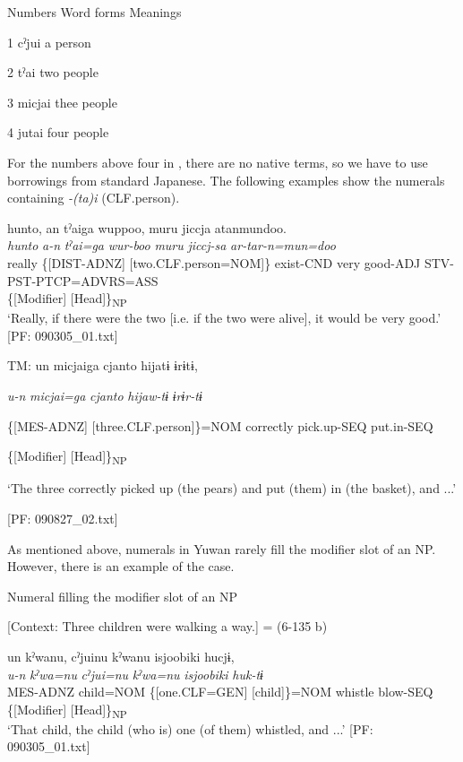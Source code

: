 Numbers  Word forms  Meanings

1  cˀjui  a person

2  tˀai  two people

3  micjai  thee people

4  jutai  four people

For the numbers above four in , there are no native terms, so we have to use borrowings from standard Japanese. The following examples show the numerals containing \textit{{}-(ta)i} (CLF.person).

\ea \label{ex:7:14}
\ea \label{ex:7:14a}
\gllll  hunto,  an  tˀaiga  wuppoo,  muru   jiccja  atanmundoo.\\
\textit{hunto}  \textit{a-n}  \textit{tˀai=ga}  \textit{wur-boo}  \textit{muru}  \textit{jiccj-sa}  \textit{ar-tar-n=mun=doo}\\
really  \{[DIST-ADNZ]  [two.CLF.person=NOM]\}  exist-CND  very   good-ADJ  STV-PST-PTCP=ADVRS=ASS\\
\{[Modifier]  [Head]\}\textsubscript{NP}    \\
\glt ‘Really, if there were the two [i.e. if the two were alive], it would be very good.’ [PF: 090305\_01.txt]

\ex \label{ex:7:14b}TM:  un  micjaiga  {\textbar}cjanto{\textbar}  hijatɨ  ɨrɨtɨ,

      \textit{u-n}  \textit{micjai=ga}  \textit{cjanto}  \textit{hijaw-tɨ}      \textit{ɨrɨr-tɨ}
                                                                             
      \{[MES-ADNZ]  [three.CLF.person]\}=NOM  correctly  pick.up-SEQ            put.in-SEQ

      \{[Modifier]  [Head]\}\textsubscript{NP}    

      ‘The three correctly picked up (the pears) and put (them) in (the basket), and ...’

      [PF: 090827\_02.txt]
    \z
\z

As mentioned above, numerals in Yuwan rarely fill the modifier slot of an NP. However, there is an example of the case.

\ea \label{ex:7:15}  Numeral filling the modifier slot of an NP

  [Context: Three children were walking a way.] = (6-135 b)

\gllll  un  kˀwanu,  cˀjuinu  kˀwanu  isjoobiki   hucjɨ,\\
\textit{u-n}  \textit{kˀwa=nu}  \textit{cˀjui=nu}  \textit{kˀwa=nu}  \textit{isjoobiki} \textit{huk-tɨ}\\
MES-ADNZ  child=NOM  \{[one.CLF=GEN]  [child]\}=NOM  whistle   blow-SEQ\\
\{[Modifier]  [Head]\}\textsubscript{NP}      \\
\glt ‘That child, the child (who is) one (of them) whistled, and ...’ [PF: 090305\_01.txt]
\z

